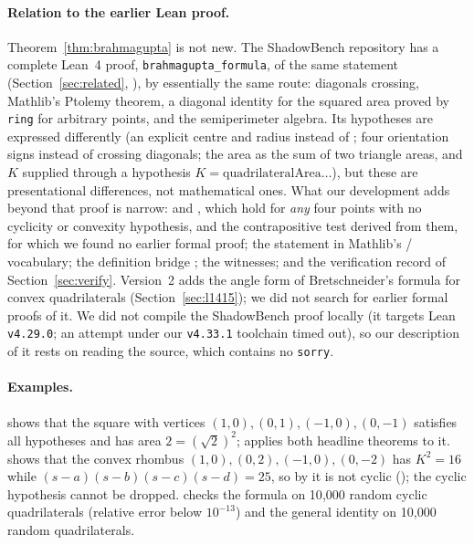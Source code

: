 \documentclass[11pt]{article}
\theoremstyle{definition}
\theoremstyle{remark}
\newcommand{\lean}[1]{\texttt{#1}}
\begin{document}
\paragraph{Relation to the earlier Lean proof.} Theorem~\ref{thm:brahmagupta} is not new. The
ShadowBench repository has a complete Lean~4 proof, \lean{brahmagupta\_formula}, of the same
statement (Section~\ref{sec:related}, \cite{ShadowBenchProof}), by essentially the same route:
diagonals crossing, Mathlib's Ptolemy theorem, a diagonal identity for the squared area proved
by \lean{ring} for arbitrary points, and the semiperimeter algebra. Its hypotheses are expressed
differently (an explicit centre and radius instead of ; four orientation
signs instead of crossing diagonals; the area as the sum of two triangle areas, and $K$ supplied
through a hypothesis $K=\mathrm{quadrilateralArea}\ldots$), but these are presentational
differences, not mathematical ones. What our development adds beyond that proof is narrow:
 and , which hold for
\emph{any} four points with no cyclicity or convexity hypothesis, and the contrapositive test
 derived from them, for which we found no earlier
formal proof; the statement in Mathlib's / vocabulary; the
definition bridge ; the witnesses; and the
verification record of Section~\ref{sec:verify}. Version~2 adds the angle form of Bretschneider's
formula for convex quadrilaterals (Section~\ref{sec:l1415}); we did not search for earlier formal
proofs of it. We did not compile the ShadowBench proof
locally (it targets Lean \texttt{v4.29.0}; an attempt under our \texttt{v4.33.1} toolchain timed
out), so our description of it rests on reading the source, which contains no \lean{sorry}.

\paragraph{Examples.}  shows that the square with vertices
$(1,0),(0,1),(-1,0),(0,-1)$ satisfies all hypotheses and has area $2=(\sqrt2)^2$;
 applies both headline theorems to it.
 shows that the convex rhombus $(1,0),(0,2),(-1,0),(0,-2)$ has
$K^2=16$ while $(s-a)(s-b)(s-c)(s-d)=25$, so by 
it is not cyclic (); the cyclic hypothesis cannot be
dropped.  checks the formula on 10{,}000 random cyclic
quadrilaterals (relative error below $10^{-13}$) and the general identity on 10{,}000 random
quadrilaterals.
\end{document}
